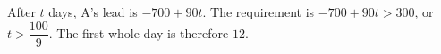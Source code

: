 After $t$ days, A's lead is $-700+90t$. The requirement is $-700+90t>300$, or $t>\dfrac{100}{9}$. The first whole day is therefore $\boxed{12}$.
